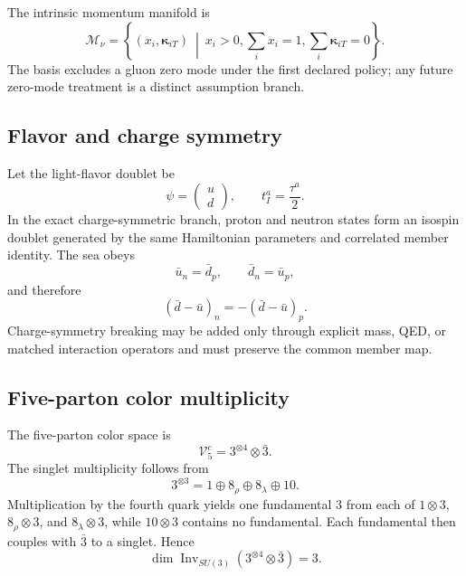\documentclass[11pt]{article}
\newcommand{\cM}{\mathcal M}
\newcommand{\cV}{\mathcal V}
\begin{document}
The intrinsic momentum manifold is
\begin{equation}
 \cM_{\nu}
 =
 \left\{
 (x_i,\bm\kappa_{iT})
 \ \middle|\
 x_i>0,
 \sum_i x_i=1,
 \sum_i\bm\kappa_{iT}=0
 \right\}.
 \label{eq:momentum-manifold}
\end{equation}
The basis excludes a gluon zero mode under the first declared policy; any
future zero-mode treatment is a distinct assumption branch.

\subsection{Flavor and charge symmetry}

Let the light-flavor doublet be
\begin{equation}
 \psi=
 \begin{pmatrix}u\\d\end{pmatrix},
 \qquad
 t^a_I=\frac{\tau^a}{2}.
\end{equation}
In the exact charge-symmetric branch, proton and neutron states form an
isospin doublet generated by the same Hamiltonian parameters and correlated
member identity.  The sea obeys
\begin{equation}
 \bar u_n=\bar d_p,
 \qquad
 \bar d_n=\bar u_p,
 \label{eq:sea-isospin}
\end{equation}
and therefore
\begin{equation}
 \left(\bar d-\bar u\right)_n
 =-
 \left(\bar d-\bar u\right)_p.
\end{equation}
Charge-symmetry breaking may be added only through explicit mass, QED, or
matched interaction operators and must preserve the common member map.

\subsection{Five-parton color multiplicity}

The five-parton color space is
\begin{equation}
 \cV_{5}^{c}
 =3^{\otimes4}\otimes\bar3.
\end{equation}
The singlet multiplicity follows from
\begin{equation}
 3^{\otimes3}
 =1\oplus8_{\rho}\oplus8_{\lambda}\oplus10.
\end{equation}
Multiplication by the fourth quark yields one fundamental \(3\) from each of
\(1\otimes3\), \(8_{\rho}\otimes3\), and
\(8_{\lambda}\otimes3\), while \(10\otimes3\) contains no fundamental.
Each fundamental then couples with \(\bar3\) to a singlet.  Hence
\begin{equation}
 \dim\operatorname{Inv}_{SU(3)}
 \left(3^{\otimes4}\otimes\bar3\right)
 =3.
 \label{eq:five-singlet-count}
\end{equation}
\end{document}
